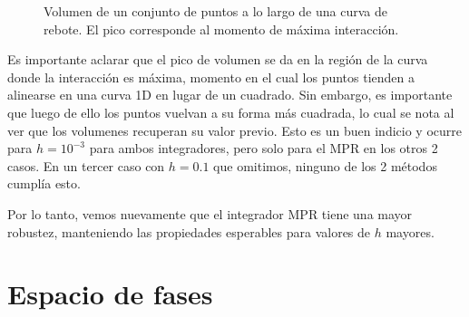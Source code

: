 \documentclass[twoside, 12pt]{article}
\begin{document}
\begin{figure}[h]
	\centering
	\caption{Volumen de un conjunto de puntos a lo largo de una curva de rebote. El pico corresponde al momento de máxima interacción.}
	\label{fig:vol_fas}
\end{figure}

Es importante aclarar que el pico de volumen se da en la región de la curva donde la interacción es máxima, momento en el cual los puntos tienden a alinearse en una curva 1D en lugar de un cuadrado.
Sin embargo, es importante que luego de ello los puntos vuelvan a su forma más cuadrada, lo cual se nota al ver que los volumenes recuperan su valor previo.
Esto es un buen indicio y ocurre para $h=10^{-3}$ para ambos integradores, pero solo para el MPR en los otros 2 casos.
En un tercer caso con $h=0.1$ que omitimos, ninguno de los 2 métodos cumplía esto.

Por lo tanto, vemos nuevamente que el integrador MPR tiene una mayor robustez, manteniendo las propiedades esperables para valores de $h$ mayores.


\section{Espacio de fases}
\end{document}
